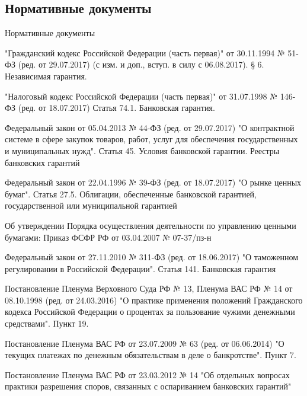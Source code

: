 \documentclass[_Banking_p3.tex]{subfiles}
\begin{document}

\subsection{Нормативные документы}
\begin{frame}[allowframebreaks]{Нормативные документы}
  \begin{thebibliography}{10}
  
  \beamertemplatearticlebibitems

"Гражданский кодекс Российской Федерации (часть первая)" от 30.11.1994 № 51-ФЗ (ред. от 29.07.2017) (с изм. и доп., вступ. в силу с 06.08.2017). § 6. Независимая гарантия.

"Налоговый кодекс Российской Федерации (часть первая)" от 31.07.1998 № 146-ФЗ (ред. от 18.07.2017) Статья 74.1. Банковская гарантия.

\pagebreak

Федеральный закон от 05.04.2013 № 44-ФЗ (ред. от 29.07.2017) "О контрактной системе в сфере закупок товаров, работ, услуг для обеспечения государственных и муниципальных нужд". Статья 45. Условия банковской гарантии. Реестры банковских гарантий

Федеральный закон от 22.04.1996 № 39-ФЗ (ред. от 18.07.2017) "О рынке ценных бумаг". Статья 27.5. Облигации, обеспеченные банковской гарантией, государственной или муниципальной гарантией

\pagebreak

Об утверждении Порядка осуществления деятельности по управлению ценными бумагами: Приказ ФСФР РФ от 03.04.2007 № 07-37/пз-н

Федеральный закон от 27.11.2010 № 311-ФЗ (ред. от 18.06.2017) "О таможенном регулировании в Российской Федерации". Статья 141. Банковская гарантия

\pagebreak

Постановление Пленума Верховного Суда РФ № 13, Пленума ВАС РФ № 14 от 08.10.1998 (ред. от 24.03.2016) "О практике применения положений Гражданского кодекса Российской Федерации о процентах за пользование чужими денежными средствами". Пункт 19.

Постановление Пленума ВАС РФ от 23.07.2009 № 63 (ред. от 06.06.2014) "О текущих платежах по денежным обязательствам в деле о банкротстве". Пункт 7.

\pagebreak

Постановление Пленума ВАС РФ от 23.03.2012 № 14 "Об отдельных вопросах практики разрешения споров, связанных с оспариванием банковских гарантий"

  \end{thebibliography}
\end{frame}
\end{document}
